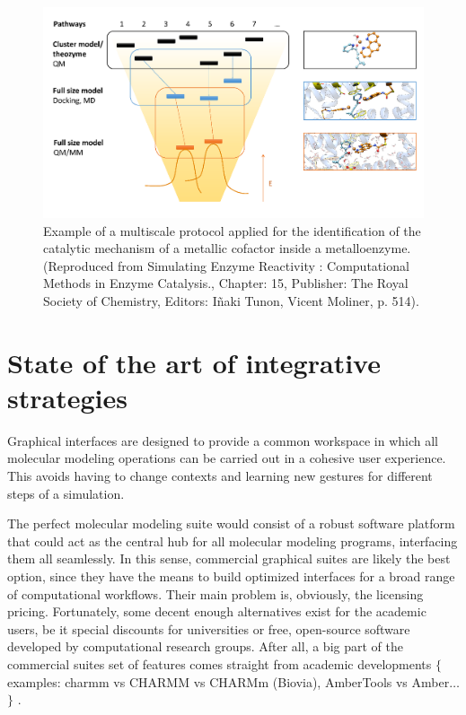 \begin{figure}[H]
		\includegraphics[width=\textwidth]{./figures/01/multiscaleprotocol.png}
		\caption[Example of a multiscale protocol]{Example of a multiscale protocol applied for the identification of the catalytic mechanism of a metallic cofactor inside a metalloenzyme.\cite{victor2014} (Reproduced from Simulating Enzyme Reactivity : Computational Methods in Enzyme Catalysis., Chapter: 15, Publisher: The Royal Society of Chemistry, Editors: Iñaki Tunon, Vicent Moliner, p. 514).}
		\label{fig:multiscale}
\end{figure}

\section{State of the art of integrative strategies}



Graphical interfaces are designed to provide a common workspace in which all molecular modeling operations can be carried out in a cohesive user experience. This avoids having to change contexts and learning new gestures for different steps of a simulation.

The perfect molecular modeling suite would consist of a robust software platform that could act as the central hub for all molecular modeling programs, interfacing them all seamlessly. In this sense, commercial graphical suites are likely the best option, since they have the means to build optimized interfaces for a broad range of computational workflows. Their main problem is, obviously, the licensing pricing. Fortunately, some decent enough alternatives exist for the academic users, be it special discounts for universities or free, open-source software developed by computational research groups. After all, a big part of the commercial suites set of features comes straight from academic developments $ \{ $ examples: charmm vs CHARMM vs CHARMm (Biovia), AmberTools vs Amber$ \ldots $ $ \} $ .

